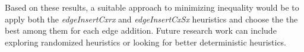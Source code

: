 Based on these results, a suitable approach to minimizing inequality would be to apply both the \textit{edgeInsertCxrx} and \textit{edgeInsertCxSx} heuristics and choose the the best among them for each edge addition. Future research work can include exploring randomized heuristics or looking for better deterministic heuristics.


